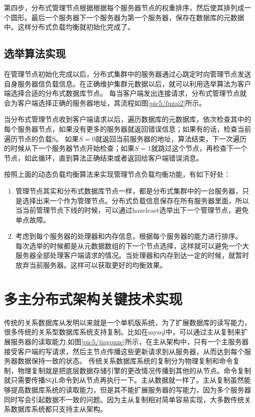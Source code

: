 第四步，分布式管理节点根据根据每个服务器节点的权重排序，然后使其排列成一个圆形。最后一个服务器下一个服务器为第一个服务器，保存在数据库的元数据中。这样分布式负载均衡就初始化完成了。
\subsection{选举算法实现}
在管理节点初始化完成以后，分布式集群中的服务器通过心跳定时向管理节点发送自身服务器信负载信息。在正确维护集群元数据以后，就可以利用选举算法为客户端选择合适的分布式数据库节点。
每当客户端发出连接请求，分布式管理节点就会为客户端选择正确的服务器地址，其流程如图\ref{pic5/fuzai2}所示。

当分布式管理节点收到客户端请求以后，遍历数据库的元数据库，依次检查其中的每个服务器节点，如果没有更多的服务器就返回错误信息；如果有的话，检查当前遍历节点的负载S。
如果$ S=0 $就返回当前服务器的地址，算法结束，下一次遍历的时候从下一个服务器节点开始检查；如果$ S=1 $就跳过这个节点，再检查下一个节点，如此循环，直到算法正确结束或者返回给客户端错误消息。

按照上面的动态负载均衡算法来实现管理节点负载均衡功能，有如下好处：
\begin{enumerate}
	\item 管理节点其实和分布式数据库节点一样，都是分布式集群中的一台服务器，只是选择出来一个作为管理节点。分布式负载信息保存在所有服务器里面，所以当当前管理节点下线的时候，可以通过hazelcast选举出下一个管理节点，避免单点故障。
	\item 考虑到每个服务器的处理器和内存信息，根据每个服务器的能力进行排序。
	每次选举的时候都是从元数据数组的下一个节点选择，这样就可以避免一个大服务器全部处理客户端请求的情况。当处理器和内存到达一定的时候，就暂时放弃当前服务器。这样可以获取更好的均衡效果。
\end{enumerate}
\section{多主分布式架构关键技术实现}
传统的关系数据库从发明以来就是一个单机版系统，为了扩展数据库的读写能力，很多传统的关系型数据库系统支持复制。比如在mysql中，可以通过主从复制来扩展服务器的读取能力,如图\ref{pic5/jiagouzc}所示，在主从架构中，只有一个主服务器接受客户端的写请求，然后主节点传播这些更新请求到从服务器，从而达到每个服务器数据保持一致的状态。
传统关系数据库系统的复制分为物理复制和命令复制，物理复制就是把底层数据存储引擎的更改情况传播到其他的从节点。命令复制就只需要传播SQL命令到从节点再执行一下。主从数据就一样了。主从复制虽然能够提高数据库系统的读取能力，但是其不能扩展服务器的写能力，因为多个服务器同时写会引起数据不一致的问题。因为主从复制相对简单容易实现，大多数传统关系数据库系统都只支持主从架构。

